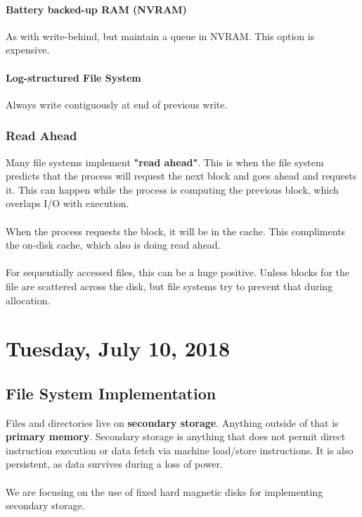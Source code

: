 \documentclass{article}
\begin{document}
\paragraph{Battery backed-up RAM (NVRAM)} As with write-behind, but maintain a queue in NVRAM. This option is expensive.

\paragraph{Log-structured File System} Always write contiguously at end of previous write.

\subsubsection{Read Ahead}

Many file systems implement \textbf{"read ahead"}. This is when the file system predicts that the process will request the next block and goes ahead and requests it. This can happen while the process is computing the previous block, which overlaps I\slash O with execution.
\\
\\
When the process requests the block, it will be in the cache. This compliments the on-disk cache, which also is doing read ahead.
\\
\\
For sequentially accessed files, this can be a huge positive. Unless blocks for the file are scattered across the disk, but file systems try to prevent that during allocation.

\newpage


\section{Tuesday, July 10, 2018}

\subsection{File System Implementation}

Files and directories live on \textbf{secondary storage}. Anything outside of that is \textbf{primary memory}. Secondary storage is anything that does not permit direct instruction execution or data fetch via machine load\slash store instructions. It is also persistent, as data survives during a loss of power.
\\
\\
We are focusing on the use of fixed hard magnetic disks for implementing secondary storage.
\end{document}
